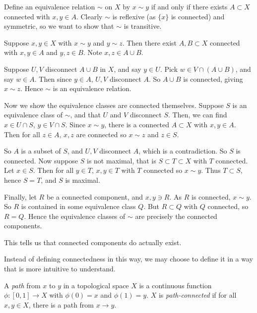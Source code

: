 \documentclass[12pt]{article}
\begin{document}
\begin{proofbox}
	Define an equivalence relation $\sim$ on $X$ by $x \sim y$ if and only if there exists $A \subset X$ connected with $x, y \in A$. Clearly $\sim$ is reflexive (as $\{x\}$ is connected) and symmetric, so we want to show that $\sim$ is transitive.

	Suppose $x, y \in X$ with $x \sim y$ and $y \sim z$. Then there exist $A, B \subset X$ connected with $x, y \in A$ and $y, z \in B$. Note $x, z \in A \cup B$.

	Suppose $U, V$ disconnect $A \cup B$ in $X$, and say $y \in U$. Pick $w \in V \cap (A \cup B)$, and say $w \in A$. Then since $y \in A$, $U, V$ disconnect $A$. So $A \cup B$ is connected, giving $x \sim z$. Hence $\sim$ is an equivalence relation.

	Now we show the equivalence classes are connected themselves. Suppose $S$ is an equivalence class of $\sim$, and that $U$ and $V$ disconnect $S$. Then, we can find $x \in U \cap S$, $y \in V \cap S$. Since $x \sim y$, there is a connected $A \subset X$ with $x,y \in A$. Then for all $z \in A$, $x, z$ are connected so $x \sim z$ and $z \in S$.

	So $A$ is a subset of $S$, and $U, V$ disconnect $A$, which is a contradiction. So $S$ is connected. Now suppose $S$ is not maximal, that is $S \subset T \subset X$ with $T$ connected. Let $x \in S$. Then for all $y \in T$, $x, y \in T$ with $T$ connected so $x \sim y$. Thus $T \subset S$, hence $S = T$, and $S$ is maximal.

	Finally, let $R$ be a connected component, and $x, y \ni R$. As $R$ is connected, $x \sim y$. So $R$ is contained in some equivalence class $Q$. But $R \subset Q$ with $Q$ connected, so $R = Q$. Hence the equivalence classes of $\sim$ are precisely the connected components.
\end{proofbox}

\begin{remark}
	This tells us that connected components do actually exist.
\end{remark}

Instead of defining connectedness in this way, we may choose to define it in a way that is more intuitive to understand.

\begin{definition}
	A \textit{path} from $x$ to $y$ in a topological space $X$ is a continuous function $\phi : [0, 1] \to X$ with $\phi(0) = x$ and $\phi(1) = y$. $X$ is \textit{path-connected} if for all $x, y \in X$, there is a path from $x \to y$.
\end{definition}
\end{document}
